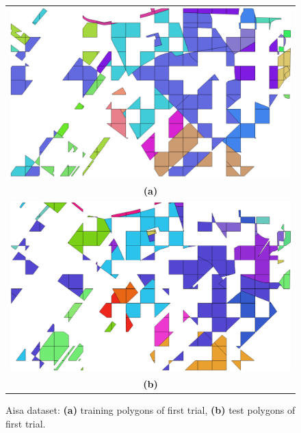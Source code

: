 \documentclass[journal]{IEEEtran}
\begin{document}
    \begin{figure}[!t]
        \centering
        \begin{tabular}{c}
            \includegraphics[width=0.7\columnwidth]{Fig/aisa_gt_train.png} \\
            {\bfseries{(a)}} \\
            \includegraphics[width=0.7\columnwidth]{Fig/aisa_gt_test.png} \\
            {\bfseries{(b)}} \\
        \end{tabular}
        \caption{Aisa dataset: {\bfseries{(a)}} training polygons of first trial, {\bfseries{(b)}} test polygons of first trial.\label{fig:set-aisa}}
    \end{figure}
\end{document}
